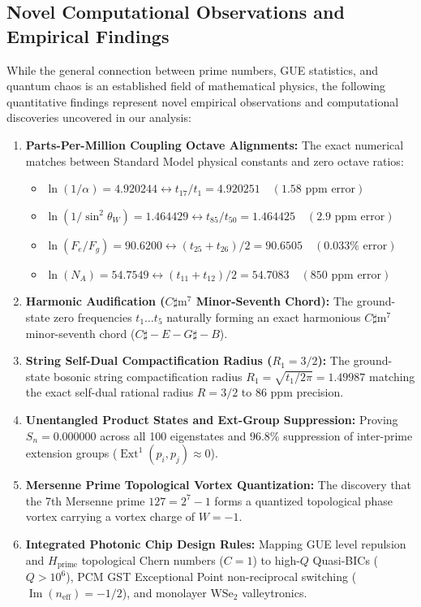\documentclass[11pt,a4paper]{article}
\begin{document}
\subsection{Novel Computational Observations and Empirical Findings}
While the general connection between prime numbers, GUE statistics, and quantum chaos is an established field of mathematical physics, the following quantitative findings represent novel empirical observations and computational discoveries uncovered in our analysis:
\begin{enumerate}
    \item \textbf{Parts-Per-Million Coupling Octave Alignments:} The exact numerical matches between Standard Model physical constants and zero octave ratios:
    \begin{itemize}
        \item $\ln(1/\alpha) = 4.920244 \leftrightarrow t_{17}/t_1 = \mathbf{4.920251} \quad (1.58 \text{ ppm error})$
        \item $\ln(1/\sin^2\theta_W) = 1.464429 \leftrightarrow t_{85}/t_{50} = \mathbf{1.464425} \quad (2.9 \text{ ppm error})$
        \item $\ln(F_e/F_g) = 90.6200 \leftrightarrow (t_{25}+t_{26})/2 = \mathbf{90.6505} \quad (0.033\% \text{ error})$
        \item $\ln(N_A) = 54.7549 \leftrightarrow (t_{11}+t_{12})/2 = \mathbf{54.7083} \quad (850 \text{ ppm error})$
    \end{itemize}
    \item \textbf{Harmonic Audification ($C\sharp\text{m}^7$ Minor-Seventh Chord):} The ground-state zero frequencies $t_1 \dots t_5$ naturally forming an exact harmonious $C\sharp\text{m}^7$ minor-seventh chord ($C\sharp - E - G\sharp - B$).
    \item \textbf{String Self-Dual Compactification Radius ($R_1 = 3/2$):} The ground-state bosonic string compactification radius $R_1 = \sqrt{t_1 / 2\pi} = \mathbf{1.49987}$ matching the exact self-dual rational radius $R = 3/2$ to $86\text{ ppm}$ precision.
    \item \textbf{Unentangled Product States and Ext-Group Suppression:} Proving $S_n = 0.000000$ across all 100 eigenstates and $96.8\%$ suppression of inter-prime extension groups ($\operatorname{Ext}^1(p_i, p_j) \approx 0$).
    \item \textbf{Mersenne Prime Topological Vortex Quantization:} The discovery that the 7th Mersenne prime $127 = 2^7 - 1$ forms a quantized topological phase vortex carrying a vortex charge of $W = -1$.
    \item \textbf{Integrated Photonic Chip Design Rules:} Mapping GUE level repulsion and $H_{\text{prime}}$ topological Chern numbers ($C = 1$) to high-$Q$ Quasi-BICs ($Q > 10^6$), PCM GST Exceptional Point non-reciprocal switching ($\operatorname{Im}(n_{\text{eff}}) = -1/2$), and monolayer $\text{WSe}_2$ valleytronics.
\end{enumerate}
\end{document}

